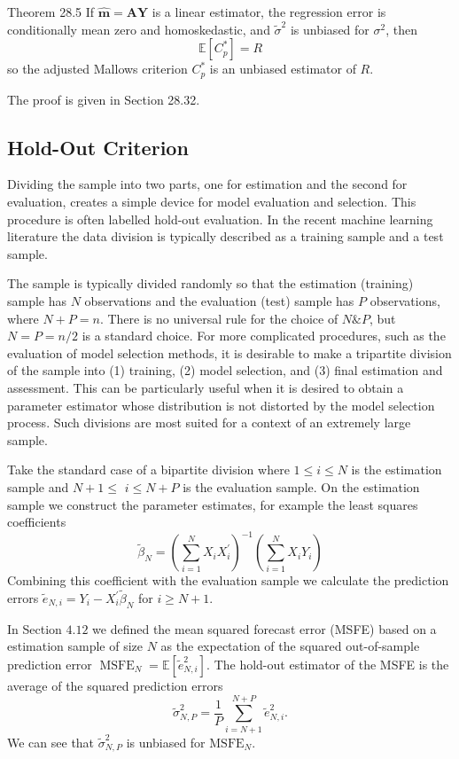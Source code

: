 \documentclass[10pt]{article}
\begin{document}
Theorem 28.5 If $\widehat{\boldsymbol{m}}=\boldsymbol{A} \boldsymbol{Y}$ is a linear estimator, the regression error is conditionally mean zero and homoskedastic, and $\widetilde{\sigma}^{2}$ is unbiased for $\sigma^{2}$, then
$$
\mathbb{E}\left[C_{p}^{*}\right]=R
$$
so the adjusted Mallows criterion $C_{p}^{*}$ is an unbiased estimator of $R$.

The proof is given in Section 28.32.

\subsection{Hold-Out Criterion}
Dividing the sample into two parts, one for estimation and the second for evaluation, creates a simple device for model evaluation and selection. This procedure is often labelled hold-out evaluation. In the recent machine learning literature the data division is typically described as a training sample and a test sample.

The sample is typically divided randomly so that the estimation (training) sample has $N$ observations and the evaluation (test) sample has $P$ observations, where $N+P=n$. There is no universal rule for the choice of $N \& P$, but $N=P=n / 2$ is a standard choice. For more complicated procedures, such as the evaluation of model selection methods, it is desirable to make a tripartite division of the sample into (1) training, (2) model selection, and (3) final estimation and assessment. This can be particularly useful when it is desired to obtain a parameter estimator whose distribution is not distorted by the model selection process. Such divisions are most suited for a context of an extremely large sample.

Take the standard case of a bipartite division where $1 \leq i \leq N$ is the estimation sample and $N+1 \leq$ $i \leq N+P$ is the evaluation sample. On the estimation sample we construct the parameter estimates, for example the least squares coefficients
$$
\widetilde{\beta}_{N}=\left(\sum_{i=1}^{N} X_{i} X_{i}^{\prime}\right)^{-1}\left(\sum_{i=1}^{N} X_{i} Y_{i}\right)
$$
Combining this coefficient with the evaluation sample we calculate the prediction errors $\widetilde{e}_{N, i}=Y_{i}-X_{i}^{\prime} \widetilde{\beta}_{N}$ for $i \geq N+1$.

In Section $4.12$ we defined the mean squared forecast error (MSFE) based on a estimation sample of size $N$ as the expectation of the squared out-of-sample prediction error $\operatorname{MSFE}_{N}=\mathbb{E}\left[\widetilde{e}_{N, i}^{2}\right]$. The hold-out estimator of the MSFE is the average of the squared prediction errors
$$
\widetilde{\sigma}_{N, P}^{2}=\frac{1}{P} \sum_{i=N+1}^{N+P} \widetilde{e}_{N, i}^{2} .
$$
We can see that $\widetilde{\sigma}_{N, P}^{2}$ is unbiased for $\mathrm{MSFE}_{N}$.
\end{document}
